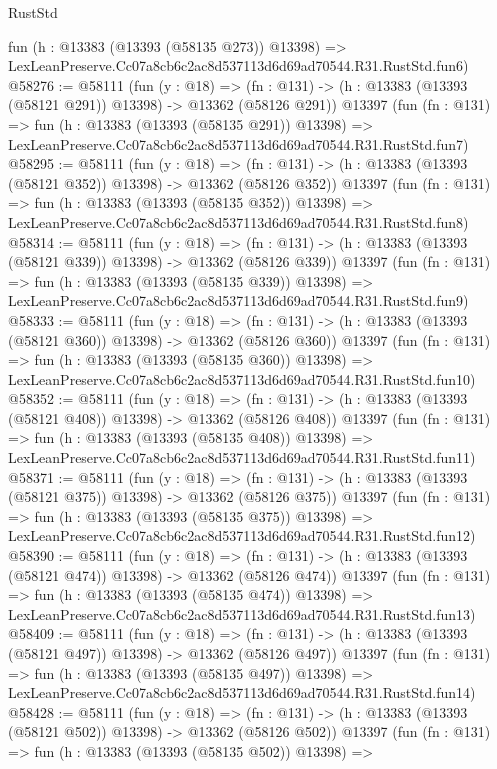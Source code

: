 \begin{lexlean}{RustStd}
\begin{coremodule}
    fun (h : @13383 (@13393 (@58135 @273)) @13398) =>
    LexLeanPreserve.Cc07a8cb6c2ac8d537113d6d69ad70544.R31.RustStd.fun6)
@58276 := @58111
    (fun (y : @18) =>
    (fn : @131) -> (h : @13383 (@13393 (@58121 @291)) @13398) -> @13362 (@58126 @291))
    @13397
    (fun (fn : @131) =>
    fun (h : @13383 (@13393 (@58135 @291)) @13398) =>
    LexLeanPreserve.Cc07a8cb6c2ac8d537113d6d69ad70544.R31.RustStd.fun7)
@58295 := @58111
    (fun (y : @18) =>
    (fn : @131) -> (h : @13383 (@13393 (@58121 @352)) @13398) -> @13362 (@58126 @352))
    @13397
    (fun (fn : @131) =>
    fun (h : @13383 (@13393 (@58135 @352)) @13398) =>
    LexLeanPreserve.Cc07a8cb6c2ac8d537113d6d69ad70544.R31.RustStd.fun8)
@58314 := @58111
    (fun (y : @18) =>
    (fn : @131) -> (h : @13383 (@13393 (@58121 @339)) @13398) -> @13362 (@58126 @339))
    @13397
    (fun (fn : @131) =>
    fun (h : @13383 (@13393 (@58135 @339)) @13398) =>
    LexLeanPreserve.Cc07a8cb6c2ac8d537113d6d69ad70544.R31.RustStd.fun9)
@58333 := @58111
    (fun (y : @18) =>
    (fn : @131) -> (h : @13383 (@13393 (@58121 @360)) @13398) -> @13362 (@58126 @360))
    @13397
    (fun (fn : @131) =>
    fun (h : @13383 (@13393 (@58135 @360)) @13398) =>
    LexLeanPreserve.Cc07a8cb6c2ac8d537113d6d69ad70544.R31.RustStd.fun10)
@58352 := @58111
    (fun (y : @18) =>
    (fn : @131) -> (h : @13383 (@13393 (@58121 @408)) @13398) -> @13362 (@58126 @408))
    @13397
    (fun (fn : @131) =>
    fun (h : @13383 (@13393 (@58135 @408)) @13398) =>
    LexLeanPreserve.Cc07a8cb6c2ac8d537113d6d69ad70544.R31.RustStd.fun11)
@58371 := @58111
    (fun (y : @18) =>
    (fn : @131) -> (h : @13383 (@13393 (@58121 @375)) @13398) -> @13362 (@58126 @375))
    @13397
    (fun (fn : @131) =>
    fun (h : @13383 (@13393 (@58135 @375)) @13398) =>
    LexLeanPreserve.Cc07a8cb6c2ac8d537113d6d69ad70544.R31.RustStd.fun12)
@58390 := @58111
    (fun (y : @18) =>
    (fn : @131) -> (h : @13383 (@13393 (@58121 @474)) @13398) -> @13362 (@58126 @474))
    @13397
    (fun (fn : @131) =>
    fun (h : @13383 (@13393 (@58135 @474)) @13398) =>
    LexLeanPreserve.Cc07a8cb6c2ac8d537113d6d69ad70544.R31.RustStd.fun13)
@58409 := @58111
    (fun (y : @18) =>
    (fn : @131) -> (h : @13383 (@13393 (@58121 @497)) @13398) -> @13362 (@58126 @497))
    @13397
    (fun (fn : @131) =>
    fun (h : @13383 (@13393 (@58135 @497)) @13398) =>
    LexLeanPreserve.Cc07a8cb6c2ac8d537113d6d69ad70544.R31.RustStd.fun14)
@58428 := @58111
    (fun (y : @18) =>
    (fn : @131) -> (h : @13383 (@13393 (@58121 @502)) @13398) -> @13362 (@58126 @502))
    @13397
    (fun (fn : @131) =>
    fun (h : @13383 (@13393 (@58135 @502)) @13398) =>

\end{coremodule}
\end{lexlean}

